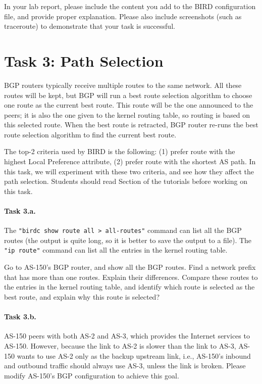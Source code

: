 In your lab report, please include the content you add to the 
BIRD configuration file, and provide proper explanation.
Please also include screenshots (such as traceroute) to demonstrate 
that your task is successful. 



\section{Task 3: Path Selection} 

BGP routers typically receive multiple routes to the same network. 
All these routes will be kept, but BGP will run a best route 
selection algorithm to choose one route as the current best route. 
This route will be the one announced to the peers; 
it is also the one given to the kernel routing table, 
so routing is based on this selected route. 
When the best route is retracted, BGP router re-runs the 
best route selection algorithm to find the current best route. 

The top-2 criteria used by BIRD is the following:
(1) prefer route with the highest Local Preference attribute,
(2) prefer route with the shortest AS path. In this task, we will
experiment with these two criteria, and see how they affect 
the path selection. Students should read Section \pathselection 
of the tutorials before working on this task.


\paragraph{Task 3.a.} The \texttt{"birdc show route all > all-routes"} command
can list all the BGP routes (the output is quite long, so it is better to
save the output to a file). The \texttt{"ip route"} command
can list all the entries in the kernel routing table. 

Go to AS-150's BGP router, and show all the BGP routes. Find a network prefix
that has more than one routes. Explain their differences. Compare these 
routes to the entries in the kernel routing table, and identify which route is 
selected as the best route, and explain why this route is selected? 


\paragraph{Task 3.b.}
AS-150 peers with both AS-2 and AS-3, which provides the 
Internet services to AS-150.
However, because the link to AS-2 is slower than
the link to AS-3, AS-150 wants 
to use AS-2 only as the backup upstream link, i.e., 
AS-150's inbound and outbound traffic should 
always use AS-3, unless the link is broken. 
Please modify AS-150's BGP configuration to achieve this goal.



